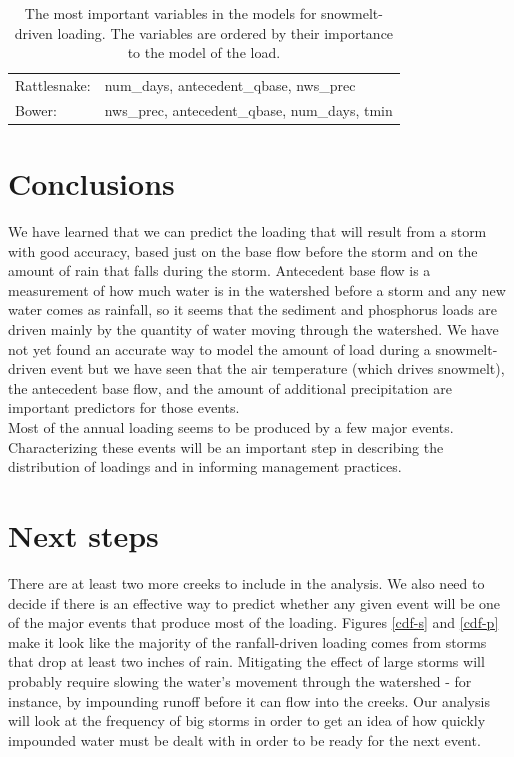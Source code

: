 \documentclass[10pt]{article}
\begin{document}
\begin{table}[h!]
\begin{center}
\begin{tabular}{ll}
        \hspace{5mm} Rattlesnake: & num\_days, antecedent\_qbase, nws\_prec\\
        \hspace{5mm} Bower: & nws\_prec, antecedent\_qbase, num\_days, tmin\\
    \end{tabular}
    \caption{The most important variables in the models for snowmelt-driven loading. The variables are ordered by their importance to the model of the load. \label{snow_predictor_list}}
    \end{center}
\end{table}

\section{Conclusions}
We have learned that we can predict the loading that will result from a storm with good accuracy, based just on the base flow before the storm and on the amount of rain that falls during the storm. Antecedent base flow is a measurement of how much water is in the watershed before a storm and any new water comes as rainfall, so it seems that the sediment and phosphorus loads are driven mainly by the quantity of water moving through the watershed. We have not yet found an accurate way to model the amount of load during a snowmelt-driven event but we have seen that the air temperature (which drives snowmelt), the antecedent base flow, and the amount of additional precipitation are important predictors for those events.\\

Most of the annual loading seems to be produced by a few major events. Characterizing these events will be an important step in describing the distribution of loadings and in informing management practices.\\

\section{Next steps}
There are at least two more creeks to include in the analysis. We also need to decide if there is an effective way to predict whether any given event will be one of the major events that produce most of the loading. Figures \ref{cdf-s} and \ref{cdf-p} make it look like the majority of the ranfall-driven loading comes from storms that drop at least two inches of rain. Mitigating the effect of large storms will probably require slowing the water's movement through the watershed - for instance, by impounding runoff before it can flow into the creeks. Our analysis will look at the frequency of big storms in order to get an idea of how quickly impounded water must be dealt with in order to be ready for the next event.
\end{document}

